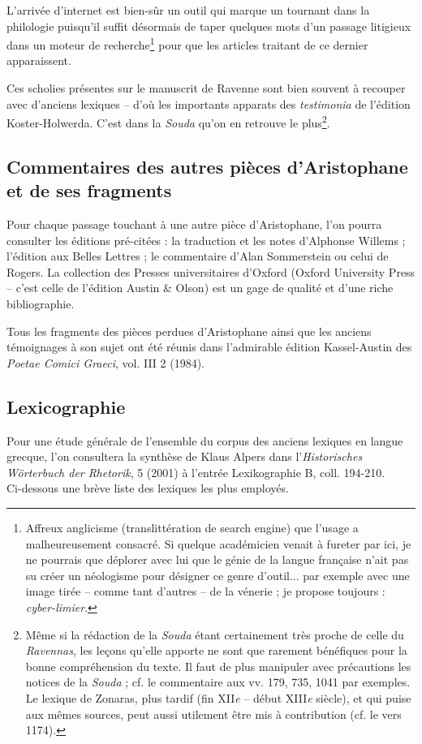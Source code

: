 \documentclass{book}%
\newcommand{\italique}[1]{\textit{#1}}%
\newcommand{\nieme}[1]{#1\italique{e}}%
\newcommand{\allemand}[1]{{\policeAll #1}}%
\newcommand{\anglais}[1]{{\policeAn \scriptsize{#1}}}%
\newcommand{\sousPartie}[1]{\subsection*{#1}}%
\newcommand{\note}[1]{\footnote{#1}}
\begin{document}
L'arrivée d'internet est bien-sûr un outil qui marque un tournant dans la philologie puisqu'il suffit désormais de taper quelques mots d'un passage litigieux dans un moteur de recherche\note{Affreux anglicisme (translittération de \anglais{search engine}) que l'usage a malheureusement consacré. Si quelque académicien venait à fureter par ici, je ne pourrais que déplorer avec lui que le génie de la langue française n'ait pas su créer un néologisme pour désigner ce genre d'outil... par exemple avec une image tirée -- comme tant d'autres -- de la vénerie ; je propose toujours : \italique{cyber-limier}.} pour que les articles traitant de ce dernier apparaissent.

Ces scholies présentes sur le manuscrit de Ravenne sont bien souvent à recouper avec d'anciens lexiques -- d'où les importants apparats des \italique{testimonia} de l'édition Koster-Holwerda. C'est dans la \italique{Souda} qu'on en retrouve le plus\note{Même si la rédaction de la \italique{Souda} étant certainement très proche de celle du \italique{Ravennas}, les leçons qu'elle apporte ne sont que rarement bénéfiques pour la bonne compréhension du texte. Il faut de plus manipuler avec précautions les notices de la \italique{Souda} ; cf. le commentaire aux vv. 179, 735, 1041 par exemples. Le lexique de Zonaras, plus tardif (fin \nieme{XII} -- début \nieme{XIII} siècle), et qui puise aux mêmes sources, peut aussi utilement être mis à contribution (cf. le vers 1174).}.

\sousPartie{Commentaires des autres pièces d'Aristophane et de ses fragments}

Pour chaque passage  touchant à une autre pièce d'Aristophane, l'on pourra consulter les éditions pré-citées : la traduction et les notes d'Alphonse Willems ; l'édition aux Belles Lettres ; le commentaire d'Alan Sommerstein ou celui de Rogers. La collection des Presses universitaires d'Oxford (\anglais{Oxford University Press} -- c'est celle de l'édition Austin \& Olson) est un gage de qualité et d'une riche bibliographie.


Tous les fragments des pièces perdues d'Aristophane ainsi que les anciens témoignages à son sujet ont été réunis dans l'admirable édition Kassel-Austin des \italique{Poetae Comici Graeci}, vol. III 2 (1984).

\sousPartie{Lexicographie}

Pour une étude générale de l'ensemble du corpus des anciens lexiques en langue grecque, l'on consultera la synthèse de Klaus Alpers dans l'\italique{Historisches Wörterbuch der Rhetorik}, 5 (2001) à l'entrée \allemand{Lexikographie} B, coll. 194-210.\\
Ci-dessous une brève liste des lexiques les plus employés.\\
\end{document}
